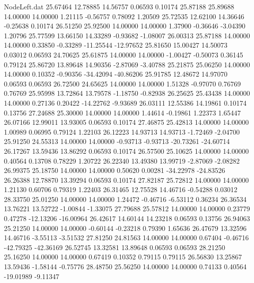 \begin{filecontents}{NodeLeft.dat}
  25.67464   12.78885   14.56757     0.06593    0.10174   25.87188   25.89688   14.00000   14.00000    1.21115   -0.56757    0.78092    1.20509
  25.72535   12.62100   14.36646    -0.25638    0.10174   26.51250   25.92500   14.00000   14.00000    1.37900   -0.36646   -3.04390    1.20796
  25.77599   13.66150   14.33289    -0.93682   -1.08007   26.00313   25.87188   14.00000   14.00000    0.33850   -0.33289  -11.25544  -12.97652
  25.81650   15.00427   14.50073     0.03012    0.06593   24.70625   25.61875   14.00000   14.00000   -1.00427   -0.50073    0.36145    0.79124
  25.86720   13.89648   14.90356    -2.87069   -3.40788   25.21875   25.06250   14.00000   14.00000    0.10352   -0.90356  -34.42094  -40.86206
  25.91785   12.48672   14.97070     0.06593    0.06593   26.72500   24.65625   14.00000   14.00000    1.51328   -0.97070    0.76769    0.76769
  25.95998   13.72864   13.79578    -1.18750   -0.82938   26.25625   25.43438   14.00000   14.00000    0.27136    0.20422  -14.22762   -9.93689
  26.03111   12.55386   14.19861     0.10174    0.13756   27.24688   25.30000   14.00000   14.00000    1.44614   -0.19861    1.22373    1.65447
  26.07166   12.99011   13.93005     0.06593    0.10174   27.46875   25.42813   14.00000   14.00000    1.00989    0.06995    0.79124    1.22103
  26.12223   14.93713   14.93713    -1.72469   -2.04700   25.91250   24.55313   14.00000   14.00000   -0.93713   -0.93713  -20.73261  -24.60714
  26.17267   13.59436   13.86292     0.06593    0.10174   26.57500   25.10625   14.00000   14.00000    0.40564    0.13708    0.78229    1.20722
  26.22340   13.49380   13.99719    -2.87069   -2.08282   26.99375   25.18750   14.00000   14.00000    0.50620    0.00281  -34.22978  -24.83526
  26.26388   12.78870   13.39294     0.06593    0.10174   27.82187   25.72812   14.00000   14.00000    1.21130    0.60706    0.79319    1.22403
  26.31465   12.75528   14.46716    -0.54288    0.03012   28.33750   25.01250   14.00000   14.00000    1.24472   -0.46716   -6.53112    0.36234
  26.36534   13.76221   13.52722    -1.00844   -1.33075   27.79688   25.57812   14.00000   14.00000    0.23779    0.47278  -12.13206  -16.00964
  26.42617   14.60144   14.23218     0.06593    0.13756   26.94063   25.21250   14.00000   14.00000   -0.60144   -0.23218    0.79390    1.65636
  26.47679   13.32596   14.46716    -3.55113   -3.51532   27.81250   24.81563   14.00000   14.00000    0.67404   -0.46716  -42.79325  -42.36169
  26.52745   13.32581   13.89648     0.06593    0.06593   28.21250   25.16250   14.00000   14.00000    0.67419    0.10352    0.79115    0.79115
  26.56830   13.25867   13.59436    -1.58144   -0.75776   28.48750   25.56250   14.00000   14.00000    0.74133    0.40564  -19.01989   -9.11347

\end{filecontents}
